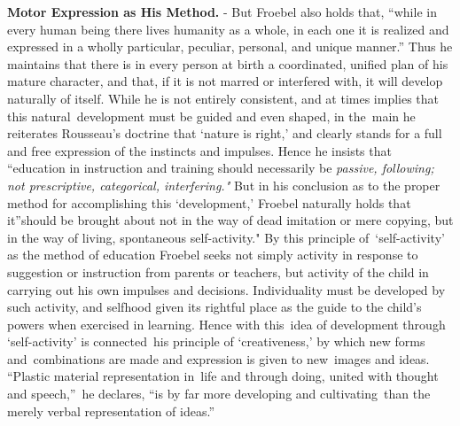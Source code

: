 \documentclass[
]{book}
\begin{document}
\textbf{Motor Expression as His Method.} - But Froebel also holds that, ``while in every human being there lives humanity as a whole, in each one it is realized and expressed in a wholly particular, peculiar, personal, and unique manner.'' Thus he maintains that there is in every person at birth a coordinated, unified plan of his mature character, and that, if it is not marred or interfered with, it will develop naturally of itself. While he is not entirely consistent, and at times implies that this natural~development must be guided and even shaped, in the~main he reiterates Rousseau's doctrine that `nature is right,' and clearly stands for a full and free expression of the instincts and impulses. Hence he insists that ``education in instruction and training should necessarily be \emph{passive, following; not prescriptive, categorical, interfering."} But in his conclusion as to the proper method for accomplishing this `development,' Froebel naturally holds that it''should be brought about not in the way of dead imitation or mere copying, but in the way of living, spontaneous self-activity." By this principle of~`self-activity' as the method of education Froebel seeks not simply activity in response to suggestion or instruction from parents or teachers, but activity of the child in carrying out his own impulses and decisions. Individuality must be developed by such activity, and selfhood given its rightful place as the guide to the child's powers when exercised in learning. Hence with this~idea of development through `self-activity' is connected~his principle of `creativeness,' by which new forms and~combinations are made and expression is given to new~images and ideas. ``Plastic material representation in~life and through doing, united with thought and speech,''~he declares, ``is by far more developing and cultivating~than the merely verbal representation of ideas.''
\end{document}
